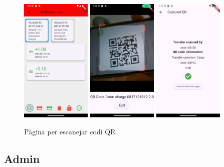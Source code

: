 \documentclass[a4paper,12pt,twoside]{ThesisStyle}
\begin{document}
\begin{figure}[h]
    \centering
    \includegraphics[width=0.3\textwidth]{imatges/mainPage1.png}
    \includegraphics[width=0.3\textwidth]{imatges/scanQR.png}
    \includegraphics[width=0.3\textwidth]{imatges/capturedQR.png}
    \caption{ Pàgina per escanejar codi QR }
    \label{fig: Pàgina per escanerjar codi QR }
\end{figure}




\clearpage
\subsection{Admin}
\label{subsec: Admin}
\end{document}
